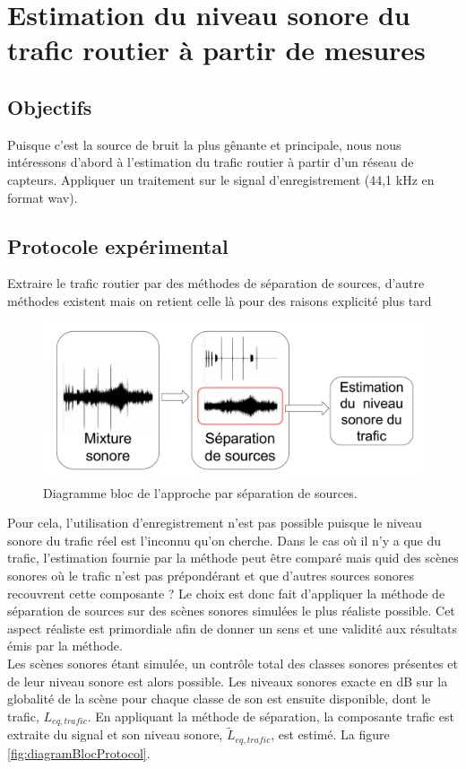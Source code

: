 \chapter{Estimation du niveau sonore du trafic routier à partir de mesures}

\section{Objectifs}
Puisque c'est la source de bruit la plus gênante et principale, nous nous intéressons d'abord à l'estimation du trafic routier à partir d'un réseau de capteurs.
Appliquer un traitement sur le signal d'enregistrement (44,1 kHz en format wav).

\section{Protocole expérimental}

Extraire le trafic routier par des méthodes de séparation de sources, d'autre méthodes existent mais on retient celle là pour des raisons explicité plus tard

\begin{figure}[t]
\centering
\includegraphics[width=0.7\linewidth]{./figures/NMF/bloc_diagram_source_separation.pdf}
\caption{Diagramme bloc de l'approche par séparation de sources.}
\end{figure}


Pour cela, l'utilisation d'enregistrement n'est pas possible puisque le niveau sonore du trafic réel est l'inconnu qu'on cherche. Dans le cas où il n'y a que du trafic, l'estimation fournie par la méthode peut être comparé mais quid des scènes sonores où le trafic n'est pas prépondérant et que d'autres sources sonores recouvrent cette composante ?
Le choix est donc fait d'appliquer la méthode de séparation de sources sur des scènes sonores simulées le plus réaliste possible. Cet aspect réaliste est primordiale afin de donner un sens et une validité aux résultats émis par la méthode.\\


Les scènes sonores étant simulée, un contrôle total des classes sonores présentes et de leur niveau sonore est alors possible. Les niveaux sonores exacte en dB sur la globalité de la scène pour chaque classe de son est ensuite disponible, dont le trafic, $L_{eq,trafic}$. En appliquant la méthode de séparation, la composante trafic est extraite du signal et son niveau sonore, $\tilde{L}_{eq,trafic}$, est estimé. La figure \ref{fig:diagramBlocProtocol}.

